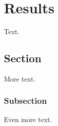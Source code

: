 \chapter{Results\label{cha:results}}

Text.

\section{Section}

More text.

\subsection{Subsection}

Even more text.